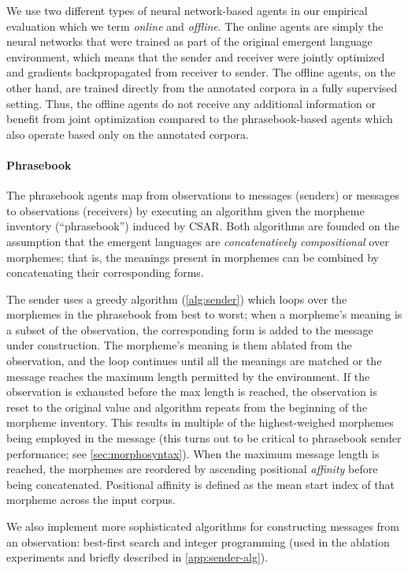 We use two different types of neural network-based agents in our empirical evaluation which we term \emph{online} and \emph{offline}.
The online agents are simply the neural networks that were trained as part of the original emergent language environment, which means that the sender and receiver were jointly optimized and gradients backpropagated from receiver to sender.
The offline agents, on the other hand, are trained directly from the annotated corpora in a fully supervised setting.
Thus, the offline agents do not receive any additional information or benefit from joint optimization compared to the phrasebook-based agents which also operate based only on the annotated corpora.


\paragraph{Phrasebook}
The phrasebook agents map from observations to messages (senders) or messages to observations (receivers) by executing an algorithm given the morpheme inventory (``phrasebook'') induced by CSAR\@.
Both algorithms are founded on the assumption that the emergent languages are \emph{concatenatively compositional} over morphemes; that is, the meanings present in morphemes can be combined by concatenating their corresponding forms.

The sender uses a greedy algorithm (\cref{alg:sender}) which loops over the morphemes in the phrasebook from best to worst;
  when a morpheme's meaning is a subset of the observation, the corresponding form is added to the message under construction.
The morpheme's meaning is them ablated from the observation, and the loop continues until all the meanings are matched or the message reaches the maximum length permitted by the environment.
If the observation is exhausted before the max length is reached, the observation is reset to the original value and algorithm repeats from the beginning of the morpheme inventory.
This results in multiple of the highest-weighed morphemes being employed in the message (this turns out to be critical to phrasebook sender performance; see \cref{sec:morphosyntax}).
When the maximum message length is reached, the morphemes are reordered by ascending positional \emph{affinity} before being concatenated.
Positional affinity is defined as the mean start index of that morpheme across the input corpus.

We also implement more sophisticated algorithms for constructing messages from an observation: best-first search and integer programming (used in the ablation experiments and briefly described in \cref{app:sender-alg}).

